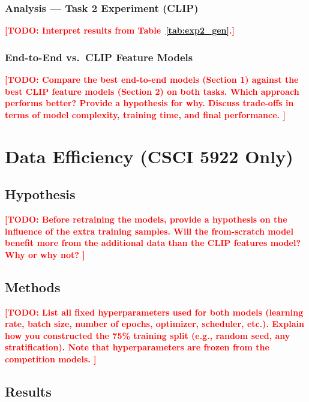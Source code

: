 \documentclass[11pt]{article}
\newcommand{\todo}[1]{\textcolor{red}{\textbf{[TODO: #1]}}}
\begin{document}
\subsubsection{Analysis — Task 2 Experiment (CLIP)}
\todo{Interpret results from Table~\ref{tab:exp2_gen}.}

\subsubsection{End-to-End vs.\ CLIP Feature Models}

\todo{
  Compare the best end-to-end models (Section 1) against the best CLIP
  feature models (Section 2) on both tasks. Which approach performs
  better? Provide a hypothesis for why. Discuss trade-offs in terms of
  model complexity, training time, and final performance.
}


\section{Data Efficiency (CSCI 5922 Only)}

\subsection{Hypothesis}

\todo{
  Before retraining the models, provide a hypothesis on the influence of the extra
training samples. Will the from-scratch model benefit more from the additional
data than the CLIP features model? Why or why not?
}

\subsection{Methods}

\todo{
  List all fixed hyperparameters used for both models (learning rate,
  batch size, number of epochs, optimizer, scheduler, etc.). Explain how
  you constructed the 75\% training split (e.g., random seed, any
  stratification). Note that hyperparameters are frozen from the
  competition models.
}

\subsection{Results}
\end{document}
